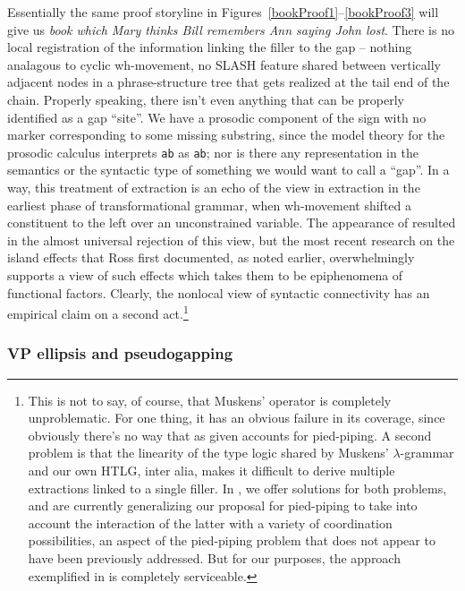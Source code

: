 \documentclass[output=paper,colorlinks,citecolor=brown]{langscibook}
\begin{document}
Essentially the same proof storyline in Figures~\ref{bookProof1}--\ref{bookProof3}
will give us \textit{book which Mary thinks Bill remembers Ann saying
John lost}. There is no local registration of the information linking
the filler to the gap -- nothing analagous to cyclic wh\hyp movement, no
SLASH feature shared between vertically adjacent nodes in a
phrase-structure tree that gets realized at the tail end of the
chain. Properly speaking, there isn't even anything that can be
properly identified as a gap ``site''. We have a prosodic component of
the sign with no marker corresponding to some missing substring, since
the model theory for the prosodic calculus interprets \texttt{a\circ b\circ \E{}} as
\texttt{a\circ b}; nor is there any representation in the semantics or the
syntactic type of something we would want to call a ``gap''. In a way,
this treatment of extraction is an echo of the view in extraction in
the earliest phase of transformational grammar, when wh-movement
shifted a constituent to the left over an unconstrained variable. The
appearance of \citet{ross67} resulted in the almost universal rejection of
this view, but the most recent research on the island effects that
Ross first documented, as noted earlier, overwhelmingly supports a view
of such effects which takes them to be epiphenomena of functional
factors. Clearly, the nonlocal view of syntactic connectivity has an
empirical claim on a second act.\footnote{This is not to say, of
course, that Muskens' operator is completely unproblematic. For one
thing, it has an obvious failure in its coverage, since obviously
there's no way that  as given accounts for pied-piping. A
second problem is that the linearity of the type logic shared by
Muskens' $\lambda$-grammar and our own HTLG, inter alia, makes it difficult
to derive multiple extractions linked to a single filler. In \citet{kubotalevineBook},
we offer solutions for both problems, and are currently generalizing
our proposal for pied-piping to take into account the interaction of
the latter with a variety of coordination possibilities, an aspect of
the pied-piping problem that does not appear to have been previously
addressed. But for our purposes, the approach exemplified in 
is completely serviceable.}

\subsubsection{VP ellipsis and pseudogapping}\label{subsubsec:VPE}
\end{document}
